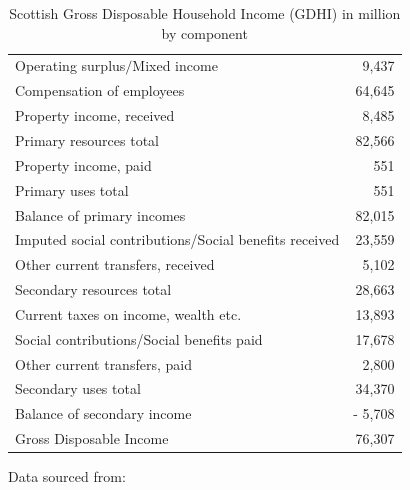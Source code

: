 \begin{enumerate}
\begin{table}[H] \caption{Scottish Gross Disposable Household Income (GDHI) in \textsterling million by component}
\bigskip \begin{scriptsize} \begin{centering} \begin{doublespacing}
    \begin{tabular}{lr}
    \toprule
    Operating surplus$/$Mixed income &          9,437  \bigstrut[t]\\
    Compensation of employees &        64,645  \\
    Property income, received &          8,485  \\
    Primary resources total &        82,566  \bigstrut[b]\\
    Property income, paid &             551  \bigstrut[t]\\
    Primary uses total &             551  \\
    Balance of primary incomes &        82,015  \\
    Imputed social contributions/Social benefits received &        23,559  \bigstrut[b]\\
    Other current transfers, received &          5,102  \bigstrut[t]\\
    Secondary resources total &        28,663  \\
    Current taxes on income, wealth etc. &        13,893  \\
    Social contributions/Social benefits paid &        17,678  \bigstrut[b]\\
    Other current transfers, paid &          2,800  \bigstrut[t]\\
    Secondary uses total &        34,370  \\
    Balance of secondary income & -        5,708  \\
    Gross Disposable Income &        76,307  \bigstrut[b]\\
\bottomrule \end{tabular}%
\bigskip \begin{flushright} Data sourced from: \cite{ONS2013a}\end{flushright} \label{tab:2.5.1} 
\end{doublespacing} \end{centering} \end{scriptsize} \end{table} \bigskip

\bigskip





\end{enumerate}
